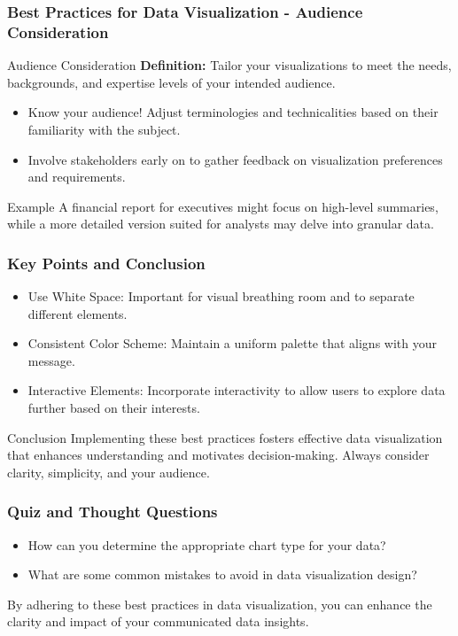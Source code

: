 \documentclass[aspectratio=169]{beamer}
\begin{document}
\begin{frame}[fragile]
    \frametitle{Best Practices for Data Visualization - Audience Consideration}
    \begin{block}{Audience Consideration}
        \textbf{Definition:} Tailor your visualizations to meet the needs, backgrounds, and expertise levels of your intended audience.
    \end{block}
    \begin{itemize}
        \item Know your audience! Adjust terminologies and technicalities based on their familiarity with the subject.
        \item Involve stakeholders early on to gather feedback on visualization preferences and requirements.
    \end{itemize}
    \begin{block}{Example}
        A financial report for executives might focus on high-level summaries, while a more detailed version suited for analysts may delve into granular data.
    \end{block}
\end{frame}

\begin{frame}[fragile]
    \frametitle{Key Points and Conclusion}
    \begin{itemize}
        \item Use White Space: Important for visual breathing room and to separate different elements.
        \item Consistent Color Scheme: Maintain a uniform palette that aligns with your message.
        \item Interactive Elements: Incorporate interactivity to allow users to explore data further based on their interests.
    \end{itemize}
    \begin{block}{Conclusion}
        Implementing these best practices fosters effective data visualization that enhances understanding and motivates decision-making. Always consider clarity, simplicity, and your audience.
    \end{block}
\end{frame}

\begin{frame}[fragile]
    \frametitle{Quiz and Thought Questions}
    \begin{itemize}
        \item How can you determine the appropriate chart type for your data?
        \item What are some common mistakes to avoid in data visualization design?
    \end{itemize}
    By adhering to these best practices in data visualization, you can enhance the clarity and impact of your communicated data insights.
\end{frame}
\end{document}
